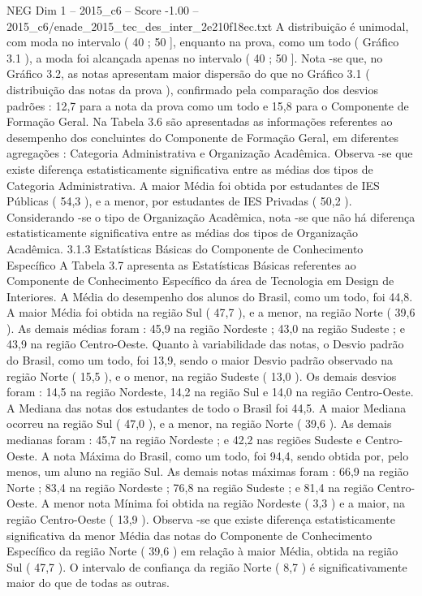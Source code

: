 \begin{textsample}{NEG Dim 1 – 2015\_c6 – Score -1.00 – 2015\_c6/enade\_2015\_tec\_des\_inter\_2e210f18ec.txt}
A distribuição é unimodal, com moda no intervalo ( 40 ; 50 ], enquanto na prova, como um todo ( Gráfico 3.1 ), a moda foi alcançada apenas no intervalo ( 40 ; 50 ].
Nota -se que, no Gráfico 3.2, as notas apresentam maior dispersão do que no Gráfico 3.1 ( distribuição das notas da prova ), confirmado pela comparação dos desvios padrões : 12,7 para a nota da prova como um todo e 15,8 para o Componente de Formação Geral.
Na Tabela 3.6 são apresentadas as informações referentes ao desempenho dos concluintes do Componente de Formação Geral, em diferentes agregações : Categoria Administrativa e Organização Acadêmica.
Observa -se que existe diferença estatisticamente significativa entre as médias dos tipos de Categoria Administrativa.
A maior Média foi obtida por estudantes de IES Públicas ( 54,3 ), e a menor, por estudantes de IES Privadas ( 50,2 ).
Considerando -se o tipo de Organização Acadêmica, nota -se que não há diferença estatisticamente significativa entre as médias dos tipos de Organização Acadêmica. 3.1.3 Estatísticas Básicas do Componente de Conhecimento Específico A Tabela 3.7 apresenta as Estatísticas Básicas referentes ao Componente de Conhecimento Específico da área de Tecnologia em Design de Interiores.
A Média do desempenho dos alunos do Brasil, como um todo, foi 44,8.
A maior Média foi obtida na região Sul ( 47,7 ), e a menor, na região Norte ( 39,6 ).
As demais médias foram : 45,9 na região Nordeste ; 43,0 na região Sudeste ; e 43,9 na região Centro-Oeste.
Quanto à variabilidade das notas, o Desvio padrão do Brasil, como um todo, foi 13,9, sendo o maior Desvio padrão observado na região Norte ( 15,5 ), e o menor, na região Sudeste ( 13,0 ).
Os demais desvios foram : 14,5 na região Nordeste, 14,2 na região Sul e 14,0 na região Centro-Oeste.
A Mediana das notas dos estudantes de todo o Brasil foi 44,5.
A maior Mediana ocorreu na região Sul ( 47,0 ), e a menor, na região Norte ( 39,6 ).
As demais medianas foram : 45,7 na região Nordeste ; e 42,2 nas regiões Sudeste e Centro-Oeste.
A nota Máxima do Brasil, como um todo, foi 94,4, sendo obtida por, pelo menos, um aluno na região Sul.
As demais notas máximas foram : 66,9 na região Norte ; 83,4 na região Nordeste ; 76,8 na região Sudeste ; e 81,4 na região Centro-Oeste.
A menor nota Mínima foi obtida na região Nordeste ( 3,3 ) e a maior, na região Centro-Oeste ( 13,9 ).
Observa -se que existe diferença estatisticamente significativa da menor Média das notas do Componente de Conhecimento Específico da região Norte ( 39,6 ) em relação à maior Média, obtida na região Sul ( 47,7 ).
O intervalo de confiança da região Norte ( 8,7 ) é significativamente maior do que de todas as outras.

\end{textsample}
